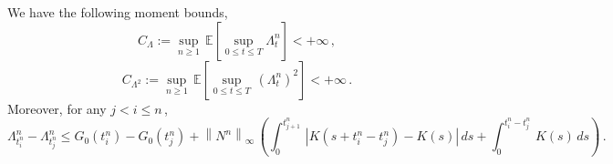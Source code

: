 \documentclass[10pt,a4paper]{amsart}
\begin{document}
\begin{lemma}
\label{lemma:estimates_process}
We have the following moment bounds,
\begin{equation}
\label{eq:bound_exp_Lambda}
C_{\Lambda} := \sup_{n \geq 1}\,\mathbb E \left[\sup_{0 \leq t \leq T} \Lambda^n_t\right] < + \infty\,,
\end{equation}
\begin{equation}
    \label{eq:bound_exp_Lambda_2}
    C_{\Lambda^2} := \sup_{n \geq 1}\, \mathbb E \left[ \sup_{0 \leq t \leq T}\, \left(\Lambda^n_t\right)^2\right] < + \infty\,.
\end{equation}
Moreover, for any $j < i \leq n\,$,
\begin{equation}
\label{eq:bound_variation_alpha}
\Lambda^n_{t^n_i} - \Lambda^n_{t^n_j} \leq G_0(t^n_i) - G_0(t^n_j) + \left\|N^n\right\|_{\infty}\, \left(\int_{0}^{t^n_{j+1}}\, \left|K(s + t^n_i - t^n_j) - K(s)\right|\,ds + \int_{0}^{t^n_i - t^n_j}\, K(s)\,ds\right)\,.
\end{equation}
\end{lemma}
\end{document}
